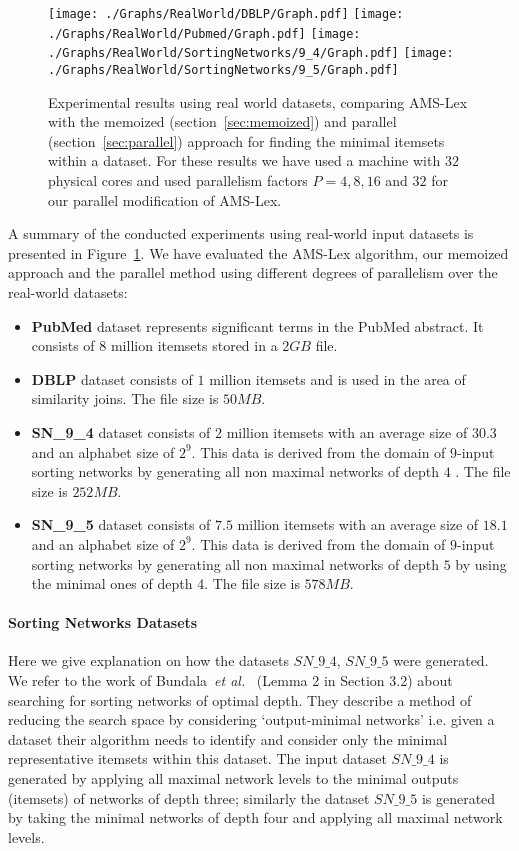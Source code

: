 \documentclass[13pt,a4paper]{article}
\begin{document}
\begin{figure} [t]
	\centering
	\texttt{[image: ./Graphs/RealWorld/DBLP/Graph.pdf]}
	\texttt{[image: ./Graphs/RealWorld/Pubmed/Graph.pdf]}
	\texttt{[image: ./Graphs/RealWorld/SortingNetworks/9\_4/Graph.pdf]}
	\texttt{[image: ./Graphs/RealWorld/SortingNetworks/9\_5/Graph.pdf]}
	\caption{Experimental results using real world datasets, comparing AMS-Lex with the memoized (section~\ref{sec:memoized}) and parallel (section~\ref{sec:parallel}) approach for finding the minimal itemsets within a dataset. For these results we have used a machine with $32$ physical cores and used parallelism factors $P=4,8,16$ and $32$ for our parallel modification of AMS-Lex.}
	\label{fig:exp:real}
\end{figure}

A summary of the conducted experiments using real-world input datasets is presented in Figure~\ref{fig:exp:real}. We have evaluated the AMS-Lex algorithm, our memoized approach and the parallel method using different degrees of parallelism over the real-world datasets:

\begin{itemize}
\item \textbf{PubMed} dataset represents significant terms in the PubMed abstract. It consists of $8$ million itemsets stored in a $2GB$ file.
\item \textbf{DBLP} dataset consists of $1$ million itemsets and is used in the area of similarity joins. The file size is $50MB$.
\item \textbf{SN\_9\_4} dataset consists of $2$ million itemsets with an average size of $30.3$ and an alphabet size of $2^9$. This data is derived from the domain of $9$-input sorting networks by generating all non maximal networks of depth $4$ . The file size is $252MB$.
\item \textbf{SN\_9\_5} dataset consists of $7.5$ million itemsets with an average size of $18.1$ and an alphabet size of $2^9$. This data is derived from the domain of $9$-input sorting networks by generating all non maximal networks of depth $5$ by using the minimal ones of depth $4$. The file size is $578MB$.
\end{itemize}


\paragraph{Sorting Networks Datasets}

Here we give explanation on how the datasets $SN\_9\_4$, $SN\_9\_5$ were generated. We refer to the work of Bundala~\textit{et al.}~\cite{BundalaCCSZ14_Optimal_Depth} (Lemma 2 in Section 3.2) about searching for sorting networks of optimal depth. They describe a method of reducing the search space by considering `output-minimal networks' i.e. given a dataset their algorithm needs to identify and consider only the minimal representative itemsets within this dataset. The input dataset $SN\_9\_4$ is generated by applying all maximal network levels to the minimal outputs (itemsets) of networks of depth three; similarly the dataset $SN\_9\_5$ is generated by taking the minimal networks of depth four and applying all maximal network levels. 
\end{document}
